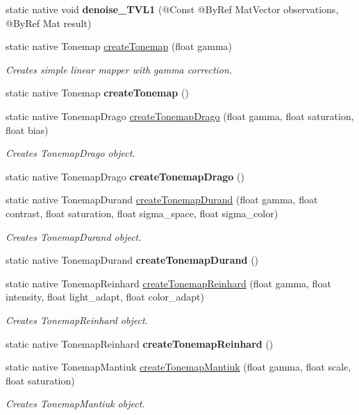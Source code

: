 \begin{DoxyCompactItemize}
static native void {\bfseries denoise\+\_\+\+T\+V\+L1} (@Const @By\+Ref Mat\+Vector observations, @By\+Ref Mat result)
\item 
static native Tonemap \hyperlink{group__photo__hdr_gafe2ea9dc47d0ec1d3a5ec361ab19de32}{create\+Tonemap} (float gamma)
\begin{DoxyCompactList}\small\item\em Creates simple linear mapper with gamma correction. \end{DoxyCompactList}\item 
static native Tonemap {\bfseries create\+Tonemap} ()
\item 
static native Tonemap\+Drago \hyperlink{group__photo__hdr_ga1850aec7f1cd1ea1bde49da2093275cd}{create\+Tonemap\+Drago} (float gamma, float saturation, float bias)
\begin{DoxyCompactList}\small\item\em Creates Tonemap\+Drago object. \end{DoxyCompactList}\item 
static native Tonemap\+Drago {\bfseries create\+Tonemap\+Drago} ()
\item 
static native Tonemap\+Durand \hyperlink{group__photo__hdr_ga797e4fa1a099e588d6ec45b1c87a772a}{create\+Tonemap\+Durand} (float gamma, float contrast, float saturation, float sigma\+\_\+space, float sigma\+\_\+color)
\begin{DoxyCompactList}\small\item\em Creates Tonemap\+Durand object. \end{DoxyCompactList}\item 
static native Tonemap\+Durand {\bfseries create\+Tonemap\+Durand} ()
\item 
static native Tonemap\+Reinhard \hyperlink{group__photo__hdr_gaa8a5689f2ff5c92529865de652f8cfba}{create\+Tonemap\+Reinhard} (float gamma, float intensity, float light\+\_\+adapt, float color\+\_\+adapt)
\begin{DoxyCompactList}\small\item\em Creates Tonemap\+Reinhard object. \end{DoxyCompactList}\item 
static native Tonemap\+Reinhard {\bfseries create\+Tonemap\+Reinhard} ()
\item 
static native Tonemap\+Mantiuk \hyperlink{group__photo__hdr_ga26b6108696f057aeaf49b8d9a454da00}{create\+Tonemap\+Mantiuk} (float gamma, float scale, float saturation)
\begin{DoxyCompactList}\small\item\em Creates Tonemap\+Mantiuk object. \end{DoxyCompactList}\item 

\end{DoxyCompactItemize}
